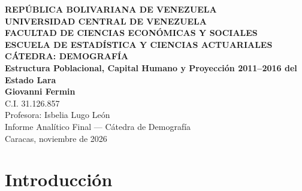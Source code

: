 \documentclass[12pt,letterpaper]{article}
\begin{document}
\begin{titlepage}
    \begin{center}
        \vspace*{0.8cm}

        \textbf{\large REPÚBLICA BOLIVARIANA DE VENEZUELA}\\[0.2cm]
        \textbf{\large UNIVERSIDAD CENTRAL DE VENEZUELA}\\[0.2cm]
        \textbf{\large FACULTAD DE CIENCIAS ECONÓMICAS Y SOCIALES}\\[0.2cm]
        \textbf{\large ESCUELA DE ESTADÍSTICA Y CIENCIAS ACTUARIALES}\\[0.2cm]
        \textbf{\large CÁTEDRA: DEMOGRAFÍA}\\[2.0cm]

        \textbf{\Large Estructura Poblacional, Capital Humano y Proyección 2011--2016 del Estado Lara}\\[2.5cm]

        \textbf{Giovanni Fermin}\\[0.15cm]
        C.I. 31.126.857\\[0.15cm]
        Profesora: Isbelia Lugo León\\[0.15cm]
        Informe Analítico Final — Cátedra de Demografía\\[2.5cm]

        Caracas, noviembre de 2026
    \end{center}
\end{titlepage}

\newpage
{}
\setcounter{page}{2}

\begingroup
\setlength{\parskip}{0pt}
\vspace{-0.5cm}
\renewcommand{\contentsname}{\centering\bfseries\Large ÍNDICE GENERAL}
\tableofcontents
\endgroup

\newpage
{}
\setcounter{page}{1}

\section{Introducción}
\end{document}
